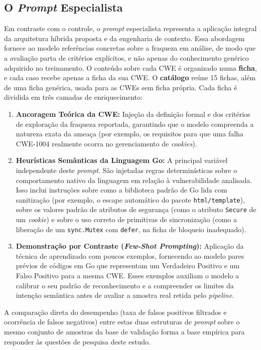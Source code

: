 \subsection{O \textit{Prompt} Especialista}
Em contraste com o controle, o \textit{prompt} especialista representa a aplicação integral da arquitetura híbrida proposta e da engenharia de contexto. Essa abordagem fornece ao modelo referências concretas sobre a fraqueza em análise, de modo que a avaliação parta de critérios explícitos, e não apenas do conhecimento genérico adquirido no treinamento. O conteúdo sobre cada CWE é organizado numa \textbf{ficha}, e cada caso recebe apenas a ficha da sua CWE. O \textbf{catálogo} reúne 15 fichas, além de uma ficha genérica, usada para as CWEs sem ficha própria. Cada ficha é dividida em três camadas de enriquecimento:

\begin{enumerate}
    \item \textbf{Ancoragem Teórica da CWE:} Injeção da definição formal e dos critérios de exploração da fraqueza reportada, garantindo que o modelo compreenda a natureza exata da ameaça (por exemplo, os requisitos para que uma falha CWE-1004 realmente ocorra no gerenciamento de \textit{cookies}).
    \item \textbf{Heurísticas Semânticas da Linguagem Go:} A principal variável independente deste \textit{prompt}. São injetadas regras determinísticas sobre o comportamento nativo da linguagem em relação à vulnerabilidade analisada. Isso inclui instruções sobre como a biblioteca padrão de Go lida com sanitização (por exemplo, o escape automático do pacote \texttt{html/template}), sobre os valores padrão de atributos de segurança (como o atributo \texttt{Secure} de um \textit{cookie}) e sobre o uso correto de primitivas de sincronização (como a liberação de um \texttt{sync.Mutex} com \texttt{defer}, na ficha de bloqueio inadequado).
    \item \textbf{Demonstração por Contraste (\textit{Few-Shot Prompting}):} Aplicação da técnica de aprendizado com poucos exemplos, fornecendo ao modelo pares prévios de códigos em Go que representam um Verdadeiro Positivo e um Falso Positivo para a mesma CWE. Esses exemplos auxiliam o modelo a calibrar o seu padrão de reconhecimento e a compreender os limites da intenção semântica antes de avaliar a amostra real retida pelo \textit{pipeline}.
\end{enumerate}

A comparação direta do desempenho (taxa de falsos positivos filtrados e ocorrência de falsos negativos) entre estas duas estruturas de \textit{prompt} sobre o mesmo conjunto de amostras da base de validação forma a base empírica para responder às questões de pesquisa deste estudo.

